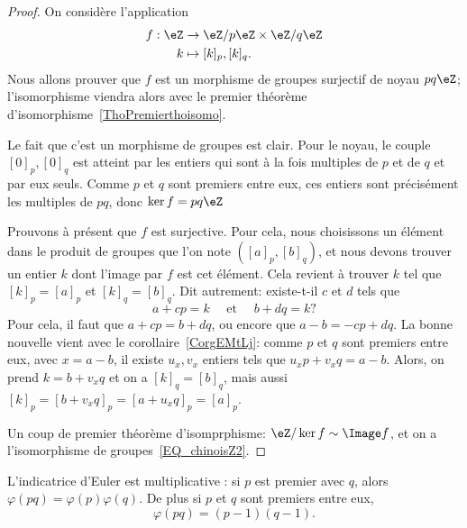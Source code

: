 \begin{proof}
  On considère l'application
  \begin{align*}
  f: \eZ &\to \eZ/p\eZ \times \eZ/q\eZ\\
  k &\mapsto [k]_p, [k]_q.
  \end{align*}
  Nous allons prouver que \( f \) est un morphisme de groupes surjectif de noyau \( pq\eZ \); l'isomorphisme viendra alors avec le premier théorème d'isomorphisme~\ref{ThoPremierthoisomo}.
  
  Le fait que c'est un morphisme de groupes est clair. Pour le noyau, le couple \([0]_p, [0]_q\) est atteint par les entiers qui sont à la fois multiples de \( p \) et de \( q \) et par eux seuls. Comme \( p \) et \( q \) sont premiers entre eux, ces entiers sont précisément les multiples de \( pq \), donc \( \ker f = pq\eZ \)
  
  Prouvons à présent que \(f\) est surjective. Pour cela, nous choisissons un élément dans le produit de groupes que l'on note \( ([a]_p, [b]_q) \), et nous devons trouver un entier \( k \) dont l'image par  \( f \) est cet élément. Cela revient à trouver \( k \) tel que  \( [k]_p =  [a]_p \) et \([k]_q = [b]_q\). Dit autrement: existe-t-il \(c \) et \( d \) tels que
  \begin{equation}
  a + cp = k \quad\text{ et }\quad b + dq = k ?
  \end{equation}
  Pour cela, il faut que \(a + cp = b + dq \), ou encore que \( a - b = - cp + dq \). La bonne nouvelle vient avec le corollaire~\ref{CorgEMtLj}: comme \( p\) et \( q\) sont premiers entre eux, avec \( x = a-b \), il existe \( u_x, v_x \) entiers tels que \(u_x p + v_x q = a - b \). Alors, on prend \( k = b + v_x q \) et on a \([k]_q = [b]_q\), mais aussi \( [k]_p =  [b + v_x q]_p = [a + u_x q]_p = [a]_p \).
  
  Un coup de premier théorème d'isomprphisme: \( \eZ / \ker f \sim \Image f \), et on a l'isomorphisme de groupes~\eqref{EQ_chinoisZ2}.
\end{proof}


\begin{corollary}       \label{CorlvTmsf}
    L'indicatrice d'Euler est multiplicative : si \( p\) est premier avec \( q\), alors \( \varphi(pq)=\varphi(p)\varphi(q)\). De plus si \( p\) et \( q\) sont premiers entre eux,
    \begin{equation}
        \varphi(pq)=(p-1)(q-1).
    \end{equation}
\end{corollary}

